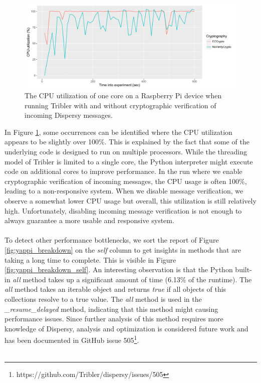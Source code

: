 \begin{figure}[!h]
	\centering
	\includegraphics[width=1.0\columnwidth]{images/experiments/raspi_cpu_usage}
	\caption{The CPU utilization of one core on a Raspberry Pi device when running Tribler with and without cryptographic verification of incoming Dispersy messages.}
	\label{fig:raspi_cpu_usage}
\end{figure}

In Figure \ref{fig:raspi_cpu_usage}, some occurrences can be identified where the CPU utilization appears to be slightly over 100\%. This is explained by the fact that some of the underlying code is designed to run on multiple processors. While the threading model of Tribler is limited to a single core, the Python interpreter might execute code on additional cores to improve performance. In the run where we enable cryptographic verification of incoming messages, the CPU usage is often 100\%, leading to a non-responsive system. When we disable message verification, we observe a somewhat lower CPU usage but overall, this utilization is still relatively high. Unfortunately, disabling incoming message verification is not enough to always guarantee a more usable and responsive system.\\\\
To detect other performance bottlenecks, we sort the report of Figure \ref{fig:yappi_breakdown} on the \emph{self} column to get insights in methods that are taking a long time to complete. This is visible in Figure \ref{fig:yappi_breakdown_self}. An interesting observation is that the Python built-in \emph{all} method takes up a significant amount of time (6.13\% of the runtime). The \emph{all} method takes an iterable object and returns \emph{true} if all objects of this collections resolve to a true value. The \emph{all} method is used in the \emph{\_resume\_delayed} method, indicating that this method might causing performance issues. Since further analysis of this method requires more knowledge of Dispersy, analysis and optimization is considered future work and has been documented in GitHub issue 505\footnote{https://github.com/Tribler/dispersy/issues/505}.\\\\

